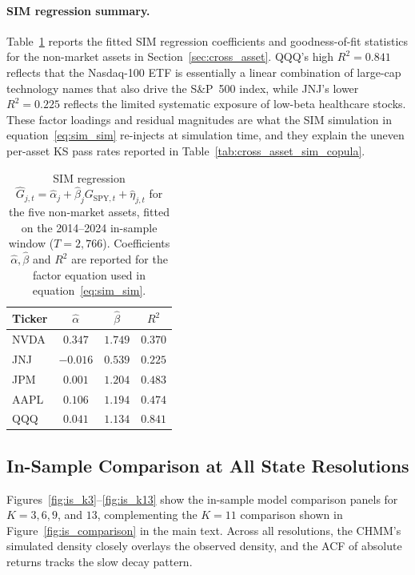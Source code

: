 \paragraph{SIM regression summary.}
Table~\ref{tab:sim_regression} reports the fitted SIM regression coefficients and goodness-of-fit statistics for the non-market assets in Section~\ref{sec:cross_asset}.
QQQ's high $R^2 = 0.841$ reflects that the Nasdaq-100 ETF is essentially a linear combination of large-cap technology names that also drive the S\&P~500 index, while JNJ's lower $R^2 = 0.225$ reflects the limited systematic exposure of low-beta healthcare stocks.
These factor loadings and residual magnitudes are what the SIM simulation in equation~\eqref{eq:sim_sim} re-injects at simulation time, and they explain the uneven per-asset KS pass rates reported in Table~\ref{tab:cross_asset_sim_copula}.

\begin{table}[H]
\centering
\caption{SIM regression $\hat{G}_{j,t} = \hat{\alpha}_j + \hat{\beta}_j G_{\text{SPY},t} + \hat{\eta}_{j,t}$ for the five non-market assets, fitted on the 2014--2024 in-sample window ($T = 2{,}766$). Coefficients $\hat{\alpha}, \hat{\beta}$ and $R^2$ are reported for the factor equation used in equation~\eqref{eq:sim_sim}.}
\label{tab:sim_regression}
\small
\begin{tabular}{l ccc}
\toprule
Ticker & $\hat{\alpha}$ & $\hat{\beta}$ & $R^2$ \\
\midrule
NVDA & $0.347$   & $1.749$ & $0.370$ \\
JNJ  & $-0.016$  & $0.539$ & $0.225$ \\
JPM  & $0.001$   & $1.204$ & $0.483$ \\
AAPL & $0.106$   & $1.194$ & $0.474$ \\
QQQ  & $0.041$   & $1.134$ & $0.841$ \\
\bottomrule
\end{tabular}
\end{table}

\subsection{In-Sample Comparison at All State Resolutions}

Figures~\ref{fig:is_k3}--\ref{fig:is_k13} show the in-sample model comparison panels for $K = 3, 6, 9$, and $13$, complementing the $K = 11$ comparison shown in Figure~\ref{fig:is_comparison} in the main text.
Across all resolutions, the CHMM's simulated density closely overlays the observed density, and the ACF of absolute returns tracks the slow decay pattern.

